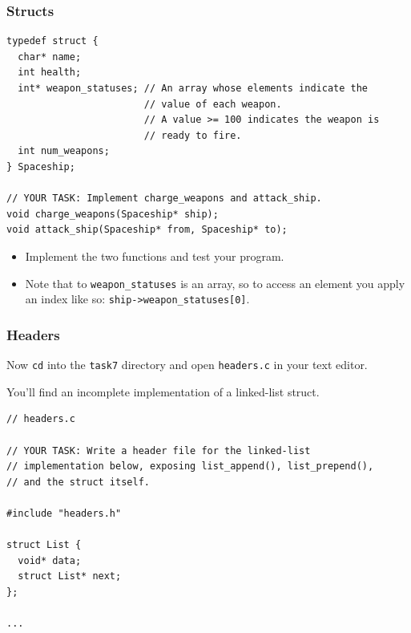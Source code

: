 \documentclass[pdf]{beamer}
\begin{document}
\begin{frame}[fragile]
  \frametitle{Structs}

\begin{verbatim}
typedef struct {
  char* name;
  int health;
  int* weapon_statuses; // An array whose elements indicate the
                        // value of each weapon.
                        // A value >= 100 indicates the weapon is
                        // ready to fire.
  int num_weapons;
} Spaceship;

// YOUR TASK: Implement charge_weapons and attack_ship.
void charge_weapons(Spaceship* ship);
void attack_ship(Spaceship* from, Spaceship* to);
\end{verbatim}

  \bigskip

  \begin{itemize}
  \item Implement the two functions and test your program.
  \item Note that to \texttt{weapon_statuses} is an array, so to access an
    element you apply an index like so: \texttt{ship->weapon_statuses[0]}.
  \end{itemize}

\end{frame}

\begin{frame}[fragile]
  \frametitle{Headers}

  Now \texttt{cd} into the \texttt{task7} directory and
  open \texttt{headers.c} in your text editor. \pause

  You'll find an incomplete implementation of a linked-list struct.

\bigskip

\begin{verbatim}
// headers.c

// YOUR TASK: Write a header file for the linked-list
// implementation below, exposing list_append(), list_prepend(),
// and the struct itself.

#include "headers.h"

struct List {
  void* data;
  struct List* next;
};

...
\end{verbatim}

\end{frame}
\end{document}

